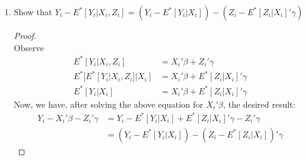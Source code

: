 \documentclass[11pt]{article}
\begin{document}
\begin{enumerate}[label = (\alph*)]
\begin{proof}
		Now, subtract the final line from the first line:
		\begin{align*}
			\underbrace{Y_i - E^*[Y_i|X_i]}_{\tilde Y_i} & = X_i'\beta - X_i'\beta + \underbrace{Z_i'\gamma - E^*[Z_i|X_i]'\gamma}_{\tilde Z_i'\gamma} + \epsilon_i \\
			\tilde Z_i \tilde Y_i & = \tilde Z_i \tilde Z_i'\gamma + \tilde Z_i\epsilon_i\\
			E[\tilde Z_i \tilde Y_i]& = E[\tilde Z_i \tilde Z_i']\gamma + E[\tilde Z_i\epsilon_i]
		\end{align*}
		Observe that $E[Z_i\epsilon_i] = 0 \Longrightarrow E[\epsilon|Z_i] = 0 \Longrightarrow E[g(Z_i)\epsilon_i] = 0 \Longrightarrow E[\tilde Z_i \epsilon_i] = 0$.\footnote{Suppose the first implication did not hold, so that $E[\epsilon|Z_i] = a$ for some $a \in \mathbb{R}$. Then $E[Z_i\epsilon_i] = E[Z_iE[\epsilon|Z_i]] = aE[Z_i]$. This final term is not equal to zero except for the special case when $E[Z_i] = 0$.} Thus, we have $$E[\tilde Z_i \tilde Y_i] = E[\tilde Z_i \tilde Z_i']\gamma,$$
		which after rearranging becomes $\gamma = E[\tilde Z_i \tilde Z_i']^{-1}E[\tilde Z_i \tilde Y_i],$ the desired result.
	\end{proof}
	\item Show that $Y_i - E^*[Y_i|X_i, Z_i] = (Y_i - E^*[Y_i|X_i]) - (Z_i - E^*[Z_i|X_i]'\gamma)$
	\begin{proof}\mbox{}\\
		Observe
		\begin{align*}
			E^*[Y_i|X_i,Z_i] & = X_i'\beta + Z_i'\gamma \\
			E^*[E^*[Y_i|X_i,Z_i]|X_i] & = X_i'\beta + E^*[Z_i|X_i]'\gamma \\
			E^*[Y_i|X_i] & = X_i'\beta + E^*[Z_i|X_i]'\gamma
		\end{align*}
		Now, we have, after solving the above equation for $X_i'\beta$, the desired result:
		\begin{align*}
		Y_i - X_i'\beta - Z_i'\gamma & = Y_i - E^*[Y_i|X_i] + E^*[Z_i|X_i]'\gamma - Z_i'\gamma \\
		& = (Y_i - E^*[Y_i|X_i]) - (Z_i - E^*[Z_i|X_i])'\gamma
		\end{align*}
	\end{proof}
\end{enumerate}
\end{document}
